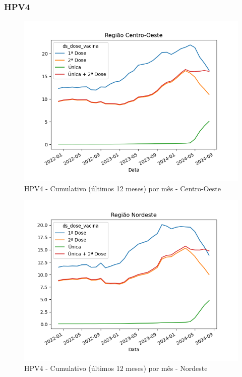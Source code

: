 \documentclass[12pt]{article}
\begin{document}
\subsubsection{HPV4}
\begin{figure}[H]
    \centering
    \includegraphics[width=0.85\linewidth]{imagens/HPV4-Centro-Oeste-Cumulativo-mes}
    \caption{HPV4 - Cumulativo (últimos 12 meses) por mês - Centro-Oeste}
    \label{fig:HPV4-centro-oeste-cumulativo}
\end{figure}
\begin{figure}[H]
    \centering
    \includegraphics[width=0.85\linewidth]{imagens/HPV4-Nordeste-Cumulativo-mes}
    \caption{HPV4 - Cumulativo (últimos 12 meses) por mês - Nordeste}
    \label{fig:HPV4-nordeste-cumulativo-mes}
\end{figure}
\end{document}

